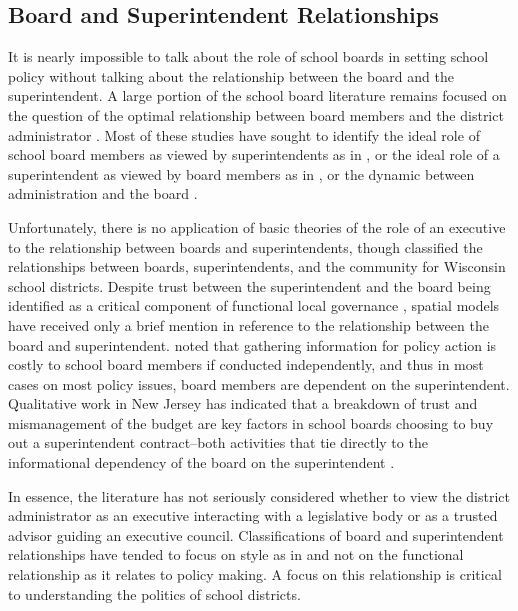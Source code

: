\subsection{Board and Superintendent Relationships}

It is nearly impossible to talk about the role of school boards in setting school 
policy without talking about the relationship between the board and the superintendent. 
A large portion of the school board literature remains focused on the question of 
the optimal relationship between board members and the district administrator 
\citep[see][]{RefWorks:233,RefWorks:263,RefWorks:227,RefWorks:251,RefWorks:229,
RefWorks:234,RefWorks:257,RefWorks:264,RefWorks:226,RefWorks:316}. Most of these 
studies have sought to identify the ideal role of school board members as viewed 
by superintendents as in \citet{RefWorks:229,RefWorks:234}, or the ideal role of 
a superintendent as viewed by board members as in \citet{RefWorks:227, RefWorks:233}, 
or the dynamic between administration and the board \citet{RefWorks:251, RefWorks:257}. 

Unfortunately, there is no application of basic theories of the role of an executive 
to the relationship between boards and superintendents, though \citet{RefWorks:251} 
classified the relationships between boards, superintendents, and the community for 
Wisconsin school districts. Despite trust between the superintendent and the board 
being identified as a critical component of functional local governance 
\citep[see][]{RefWorks:229,RefWorks:234,RefWorks:227,RefWorks:233}, spatial models 
have received only a brief mention in reference to the relationship between the 
board and superintendent. \citet{RefWorks:340} noted that gathering information 
for policy action is costly to school board members if conducted independently, 
and thus in most cases on most policy issues, board members are dependent on the 
superintendent. Qualitative work in New Jersey has indicated that a breakdown of 
trust and mismanagement of the budget are key factors in school boards choosing 
to buy out a superintendent contract--both activities that tie directly to the 
informational dependency of the board on the superintendent \citep{RefWorks:246}. 

In essence, the literature has not seriously considered whether to view the district 
administrator as an executive interacting with a legislative body or as a trusted 
advisor guiding an executive council. Classifications of board and superintendent 
relationships have tended to focus on style as in \citet{RefWorks:251} and not on 
the functional relationship as it relates to policy making. A focus on this 
relationship is critical to understanding the politics of school districts. 

